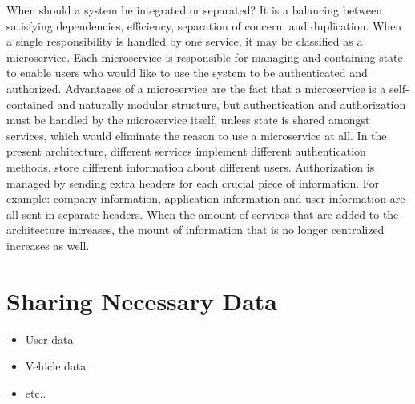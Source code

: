 When should a system be integrated or separated? It is a balancing between satisfying dependencies, efficiency, separation of concern, and duplication. When a single responsibility is handled by one service, it may be classified as a microservice. Each microservice is responsible for managing and containing state to enable users who would like to use the system to be authenticated and authorized. Advantages of a microservice are the fact that a microservice is a self-contained and naturally modular structure, but authentication and authorization must be handled by the microservice itself, unless state is shared amongst services, which would eliminate the reason to use a microservice at all. In the present architecture, different services implement different authentication methods, store different information about different users. Authorization is managed by sending extra headers for each crucial piece of information. For example: company information, application information and user information are all sent in separate headers. When the amount of services that are added to the architecture increases, the mount of information that is no longer centralized increases as well.

%
\section{Sharing Necessary Data}

\begin{itemize}
	\item User data
	\item Vehicle data
	\item etc..
\end{itemize}

%
